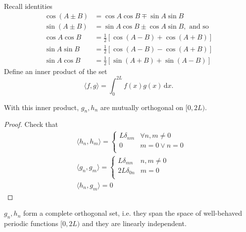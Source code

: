 \documentclass[a4paper]{article}
\begin{document}
Recall identities
\[
    \begin{aligned} \cos (A \pm B) &=\cos A \cos B \mp \sin A \sin B \\ \sin (A \pm B) &=\sin A \cos B \pm \cos A \sin B, \text { and so } \\ \cos A \cos B &=\frac{1}{2}[\cos (A-B)+\cos (A+B)] \\ \sin A \sin B &=\frac{1}{2}[\cos (A-B)-\cos (A+B)] \\ \sin A \cos B &=\frac{1}{2}[\sin (A+B)+\sin (A-B)] \end{aligned}
\]
Define an inner product of the set 
\[
    \langle f,g \rangle = \int_{0}^{2L} f(x)g(x)\,\mathrm{d}x.
\]
\begin{proposition}
    With this inner product, $g_n,h_n$ are mutually orthogonal on $ [0,2L) $.
\end{proposition}
\begin{proof}
    Check that
    \begin{align}
        &\langle h_n,h_m \rangle = \begin{cases}
            L\delta_{nm} &\forall n,m\neq 0\\
            0 & m=0 \lor n=0\\
            \end{cases} \\
            &\langle g_n,g_m \rangle = \begin{cases}
            L \delta_{mn} &n,m\neq 0\\
            2L \delta_{0n} & m=0\\
            \end{cases} \\
            &\langle h_n,g_m \rangle =0
    \end{align}
\end{proof}
$g_n,h_n$ form a complete orthogonal set, i.e. they span the space of well-behaved periodic functions $ [0,2L) $ and they are linearly independent.
\end{document}
